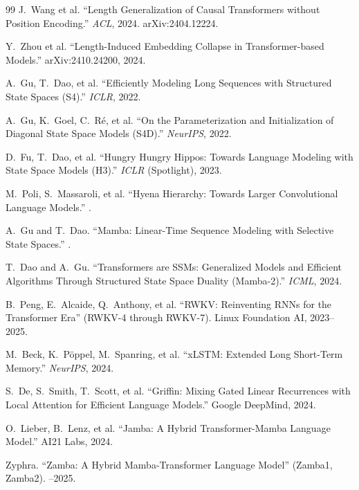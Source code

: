 \documentclass[11pt,a4paper]{article}
\begin{document}
\begin{thebibliography}{99}
 J.~Wang et al.
\newblock ``Length Generalization of Causal Transformers without Position Encoding.''
\newblock \textit{ACL}, 2024. arXiv:2404.12224.

 Y.~Zhou et al.
\newblock ``Length-Induced Embedding Collapse in Transformer-based Models.''
\newblock arXiv:2410.24200, 2024.

 A.~Gu, T.~Dao, et al.
\newblock ``Efficiently Modeling Long Sequences with Structured State Spaces (S4).''
\newblock \textit{ICLR}, 2022.

 A.~Gu, K.~Goel, C.~R\'{e}, et al.
\newblock ``On the Parameterization and Initialization of Diagonal State Space Models (S4D).''
\newblock \textit{NeurIPS}, 2022.

 D.~Fu, T.~Dao, et al.
\newblock ``Hungry Hungry Hippos: Towards Language Modeling with State Space Models (H3).''
\newblock \textit{ICLR} (Spotlight), 2023.

 M.~Poli, S.~Massaroli, et al.
\newblock ``Hyena Hierarchy: Towards Larger Convolutional Language Models.''
.

 A.~Gu and T.~Dao.
\newblock ``Mamba: Linear-Time Sequence Modeling with Selective State Spaces.''
.

 T.~Dao and A.~Gu.
\newblock ``Transformers are SSMs: Generalized Models and Efficient Algorithms Through Structured State Space Duality (Mamba-2).''
\newblock \textit{ICML}, 2024.

 B.~Peng, E.~Alcaide, Q.~Anthony, et al.
\newblock ``RWKV: Reinventing RNNs for the Transformer Era'' (RWKV-4 through RWKV-7).
\newblock Linux Foundation AI, 2023--2025.

 M.~Beck, K.~P\"{o}ppel, M.~Spanring, et al.
\newblock ``xLSTM: Extended Long Short-Term Memory.''
\newblock \textit{NeurIPS}, 2024.

 S.~De, S.~Smith, T.~Scott, et al.
\newblock ``Griffin: Mixing Gated Linear Recurrences with Local Attention for Efficient Language Models.''
\newblock Google DeepMind, 2024.

 O.~Lieber, B.~Lenz, et al.
\newblock ``Jamba: A Hybrid Transformer-Mamba Language Model.''
\newblock AI21 Labs, 2024.

 Zyphra.
\newblock ``Zamba: A Hybrid Mamba-Transformer Language Model'' (Zamba1, Zamba2).
--2025.


\end{thebibliography}
\end{document}
